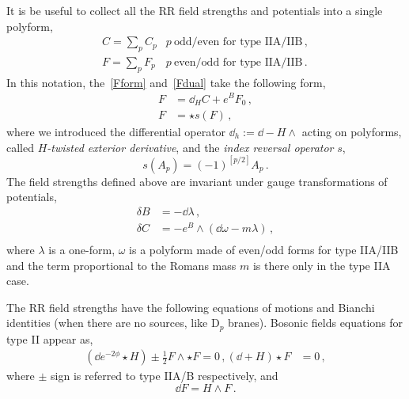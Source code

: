 \documentclass[debug]{phd}
\begin{document}
					
				It is be useful to collect all the RR field strengths and potentials into a single polyform,
						\begin{equation*}
							\begin{array}{lr}
								C = \sum_p C_p & p\ \text{odd/even for type IIA/IIB}\, , \\[3mm]
								F = \sum_p F_p & p\ \text{even/odd for type IIA/IIB}\, .								 
							\end{array}
						\end{equation*}
				In this notation, the~\eqref{Fform} and~\eqref{Fdual} take the following form,
						\begin{align*}
							F &= \dd_H C + e^B F_0\, , \\
							F &= \star s (F) \, ,
						\end{align*}
				where we introduced the differential operator $\dd_h := \dd - H \wedge$ acting on polyforms, called \emph{$H$-twisted exterior derivative}, and the \emph{index reversal operator} $s$,
						\begin{equation}
							s(A_p) = (-1)^{\left[p/2\right]} A_p \, .
						\end{equation}
				The field strengths defined above are invariant under gauge transformations of potentials,
						\begin{equation}\label{gaugetrans}
							\begin{split}
								\delta B &= - \dd \lambda \, , \\
								\delta C &= - e^B \wedge \left(\dd \omega - m \lambda \right) \, , \\
							\end{split}
						\end{equation}
				where $\lambda$ is a one-form, $\omega$ is a polyform made of even/odd forms for type IIA/IIB and the term proportional to the Romans mass $m$ is there only in the type IIA case.			
				
				The RR field strengths have the following equations of motions and Bianchi identities (when there are no sources, like $\mathrm{D}_p$ branes).
				Bosonic fields equations for type II appear as,
						\begin{align}
							(\dd e^{-2\phi} \star H) \pm \frac{1}{2} F \wedge \star F = 0 \, , \label{eom1}
							(\dd + H) \star F &= 0 \, , 
						\end{align}
				where $\pm$ sign is referred to type IIA/B respectively, and
						\begin{equation}
							\dd F = H \wedge F \, .
						\end{equation}
				
\end{document}

